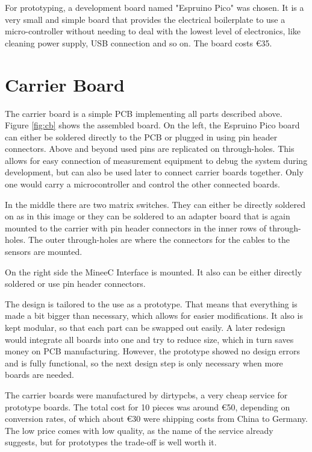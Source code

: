 For prototyping, a development board named "Espruino Pico" was chosen. It is a very small and simple board that provides the electrical boilerplate to use a micro-controller without needing to deal with the lowest level of electronics, like cleaning power supply, USB connection and so on. The board costs \euro{35}.\\

\section{Carrier Board}

The carrier board is a simple PCB implementing all parts described above. Figure \ref{fig:cb} shows the assembled board. On the left, the Espruino Pico board can either be soldered directly to the PCB or plugged in using pin header connectors. Above and beyond used pins are replicated on through-holes. This allows for easy connection of measurement equipment to debug the system during development, but can also be used later to connect carrier boards together. Only one would carry a microcontroller and control the other connected boards.

In the middle there are two matrix switches. They can either be directly soldered on as in this image or they can be soldered to an adapter board that is again mounted to the carrier with pin header connectors in the inner rows of through-holes.  The outer through-holes are where the connectors for the cables to the sensors are mounted.

On the right side the MineeC Interface is mounted. It also can be either directly soldered or use pin header connectors.

The design is tailored to the use as a prototype. That means that everything is made a bit bigger than necessary, which allows for easier modifications. It also is kept modular, so that each part can be swapped out easily. A later redesign would integrate all boards into one and try to reduce size, which in turn saves money on PCB manufacturing. However, the prototype showed no design errors and is fully functional, so the next design step is only necessary when more boards are needed.

The carrier boards were manufactured by dirtypcbs, a very cheap service for prototype boards. The total cost for 10 pieces was around \euro{50}, depending on conversion rates, of which about \euro{30} were shipping costs from China to Germany. The low price comes with low quality, as the name of the service already suggests, but for prototypes the trade-off is well worth it.

